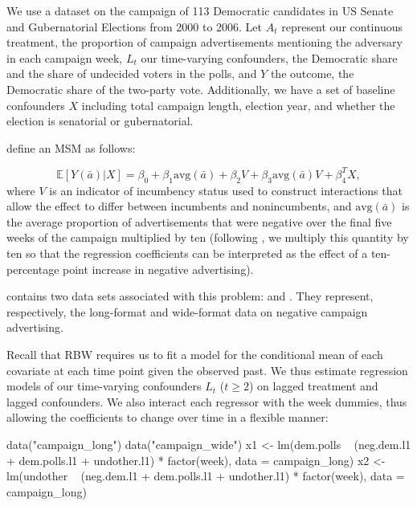 We use a dataset on the campaign of 113 Democratic candidates in US
Senate and Gubernatorial Elections from 2000 to 2006. Let \(A_{t}\)
represent our continuous treatment, the proportion of campaign
advertisements mentioning the adversary in each campaign week, \(L_{t}\)
our time-varying confounders, the Democratic share and the share of
undecided voters in the polls, and \(Y\) the outcome, the Democratic
share of the two-party vote. Additionally, we have a set of baseline
confounders \(X\) including total campaign length, election year, and
whether the election is senatorial or gubernatorial.

\citet{zhouResidualBalancingMethod2020a} define an MSM as follows:

\begin{equation}
\label{eq:15}
\mathbb{E}[Y(\bar{a})|X]=\beta_{0}+\beta_{1}\text{avg}(\bar{a})+\beta_{2}V+\beta_{3}\text{avg}(\bar{a})V+\beta_{4}^{T}X,
\end{equation}
where \(V\) is an indicator of incumbency status used to construct
interactions that allow the effect to differ between incumbents and
nonincumbents, and \(\text{avg}(\bar{a})\) is the average proportion of
advertisements that were negative over the final five weeks of the
campaign multiplied by ten (following
\citet{zhouResidualBalancingMethod2020a}, we multiply this quantity by
ten so that the regression coefficients can be interpreted as the effect
of a ten-percentage point increase in negative advertising).

 contains two data sets associated with this problem:
 and . They represent,
respectively, the long-format and wide-format data on negative campaign
advertising.

Recall that RBW requires us to fit a model for the conditional mean of
each covariate at each time point given the observed past. We thus
estimate regression models of our time-varying confounders \(L_{t}\)
(\(t\ge2\)) on lagged treatment and lagged confounders. We also interact
each regressor with the week dummies, thus allowing the coefficients to
change over time in a flexible manner:

\begin{Schunk}
\begin{Sinput}
data("campaign_long")
data("campaign_wide")
x1 <-
  lm(dem.polls ~ (neg.dem.l1 + dem.polls.l1 + undother.l1) * factor(week),
     data = campaign_long)
x2 <-
  lm(undother ~ (neg.dem.l1 + dem.polls.l1 + undother.l1) * factor(week),
     data = campaign_long)
\end{Sinput}
\end{Schunk}

